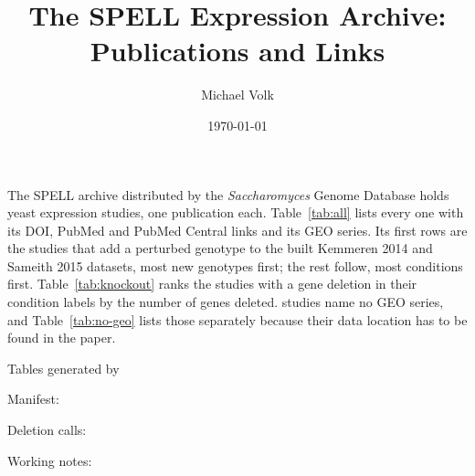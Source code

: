 \documentclass[10pt,a4paper]{article}
\title{\vspace{-1.5em}The SPELL Expression Archive: Publications and Links}
\author{Michael Volk}
\date{\today}
\begin{document}
\maketitle
\thispagestyle{empty}

\noindent
The SPELL archive distributed by the \emph{Saccharomyces} Genome Database holds
\spellNStudies{} yeast expression studies, one publication each.
Table~\ref{tab:all} lists every one with its DOI, PubMed and PubMed Central
links and its GEO series. Its first \spellNNewStudies{} rows are the studies
that add a perturbed genotype to the built Kemmeren 2014 and Sameith 2015
datasets, most new genotypes first; the rest follow, most conditions first. Table~\ref{tab:knockout} ranks the
\spellNKoStudies{} studies with a gene deletion in their condition labels by the
number of genes deleted. \spellNNoGeo{} studies name no GEO series, and
Table~\ref{tab:no-geo} lists those separately because their data location has to
be found in the paper.

\vspace{0.5em}
{\small\color{tcgray}
Tables generated by \par
Manifest: \par
Deletion calls: \par
Working notes: \par}

\vspace{1em}
\tccontents





\end{document}
